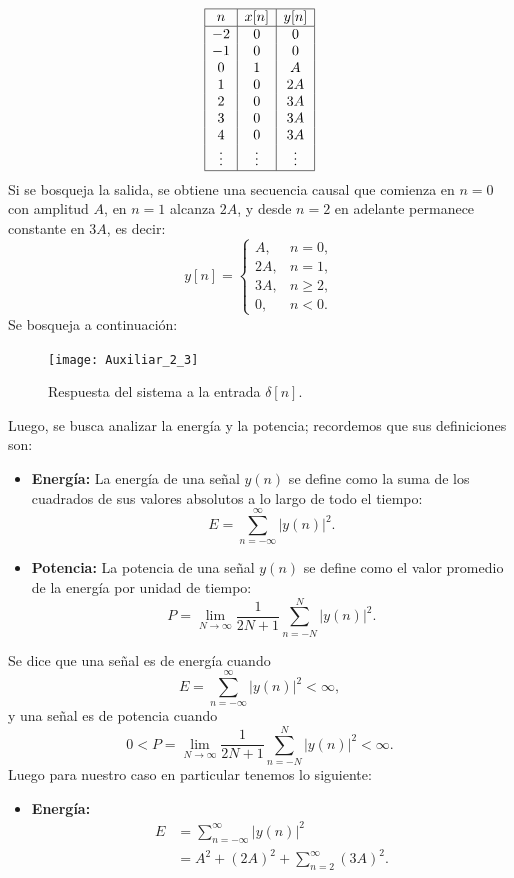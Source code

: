 \documentclass[
  11pt,
  letterpaper,
   addpoints,
   answers
  ]{exam}
\begin{document}
\begin{questions}
\begin{solution}
\[
\begin{array}{|c|c|c|}
\hline
n & x[n] & y[n] \\
\hline
-2 & 0 & 0 \\
-1 & 0 & 0 \\
0 & 1 & A \\
1 & 0 & 2A \\
2 & 0 & 3A \\
3 & 0 & 3A \\
4 & 0 & 3A \\
\vdots & \vdots & \vdots \\
\hline
\end{array}
\]
Si se bosqueja la salida, se obtiene una secuencia causal que comienza en $n=0$ con amplitud $A$, 
en $n=1$ alcanza $2A$, y desde $n=2$ en adelante permanece constante en $3A$, es decir:
\begin{equation}
y[n] = 
\begin{cases}
A, & n=0, \\
2A, & n=1, \\
3A, & n \geq 2, \\
0, & n<0.
\end{cases}
\end{equation}
Se bosqueja a continuación:
\begin{figure}[H]
  \centering
  \texttt{[image: Auxiliar\_2\_3]}
  \caption{Respuesta del sistema a la entrada $\delta[n]$.}
\end{figure}
Luego, se busca analizar la energía y la potencia; recordemos que sus definiciones son:
\begin{itemize}
  \item \textbf{Energía:} La energía de una señal $y(n)$ se define como la suma de los cuadrados de sus valores absolutos a lo largo de todo el tiempo:
\begin{equation}
E = \sum_{n=-\infty}^{\infty} |y(n)|^2.
\end{equation}
\item \textbf{Potencia:} La potencia de una señal $y(n)$ se define como el valor promedio de la energía por unidad de tiempo:
\begin{equation}
P = \lim_{N \to \infty} \frac{1}{2N+1} \sum_{n=-N}^{N} |y(n)|^2.
\end{equation}
\end{itemize}
Se dice que una señal es de energía cuando
\begin{equation}
E = \sum_{n=-\infty}^{\infty} |y(n)|^2 < \infty,
\end{equation}
y una señal es de potencia cuando
\begin{equation}
0 < P = \lim_{N \to \infty} \frac{1}{2N+1} \sum_{n=-N}^{N} |y(n)|^2 < \infty.
\end{equation}
Luego para nuestro caso en particular tenemos lo siguiente:
\begin{itemize}
\item \textbf{Energía:} 
\begin{align}
E &= \sum_{n=-\infty}^{\infty} |y(n)|^2 \\
  &= A^2 + (2A)^2 + \sum_{n=2}^{\infty} (3A)^2.
\end{align}


\end{itemize}
\end{solution}
\end{questions}
\end{document}
